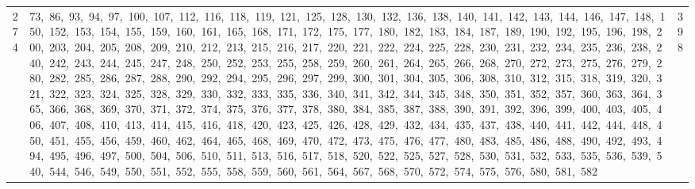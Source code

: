 \begin{longtable}{c|p{}|r}
274 & 73,\ 86,\ 93,\ 94,\ 97,\ 100,\ 107,\ 112,\ 116,\ 118,\ 119,\ 121,\ 125,\ 128,\ 130,\ 132,\ 136,\ 138,\ 140,\ 141,\ 142,\ 143,\ 144,\ 146,\ 147,\ 148,\ 150,\ 152,\ 153,\ 154,\ 155,\ 159,\ 160,\ 161,\ 165,\ 168,\ 171,\ 172,\ 175,\ 177,\ 180,\ 182,\ 183,\ 184,\ 187,\ 189,\ 190,\ 192,\ 195,\ 196,\ 198,\ 200,\ 203,\ 204,\ 205,\ 208,\ 209,\ 210,\ 212,\ 213,\ 215,\ 216,\ 217,\ 220,\ 221,\ 222,\ 224,\ 225,\ 228,\ 230,\ 231,\ 232,\ 234,\ 235,\ 236,\ 238,\ 240,\ 242,\ 243,\ 244,\ 245,\ 247,\ 248,\ 250,\ 252,\ 253,\ 255,\ 258,\ 259,\ 260,\ 261,\ 264,\ 265,\ 266,\ 268,\ 270,\ 272,\ 273,\ 275,\ 276,\ 279,\ 280,\ 282,\ 285,\ 286,\ 287,\ 288,\ 290,\ 292,\ 294,\ 295,\ 296,\ 297,\ 299,\ 300,\ 301,\ 304,\ 305,\ 306,\ 308,\ 310,\ 312,\ 315,\ 318,\ 319,\ 320,\ 321,\ 322,\ 323,\ 324,\ 325,\ 328,\ 329,\ 330,\ 332,\ 333,\ 335,\ 336,\ 340,\ 341,\ 342,\ 344,\ 345,\ 348,\ 350,\ 351,\ 352,\ 357,\ 360,\ 363,\ 364,\ 365,\ 366,\ 368,\ 369,\ 370,\ 371,\ 372,\ 374,\ 375,\ 376,\ 377,\ 378,\ 380,\ 384,\ 385,\ 387,\ 388,\ 390,\ 391,\ 392,\ 396,\ 399,\ 400,\ 403,\ 405,\ 406,\ 407,\ 408,\ 410,\ 413,\ 414,\ 415,\ 416,\ 418,\ 420,\ 423,\ 425,\ 426,\ 428,\ 429,\ 432,\ 434,\ 435,\ 437,\ 438,\ 440,\ 441,\ 442,\ 444,\ 448,\ 450,\ 451,\ 455,\ 456,\ 459,\ 460,\ 462,\ 464,\ 465,\ 468,\ 469,\ 470,\ 472,\ 473,\ 475,\ 476,\ 477,\ 480,\ 483,\ 485,\ 486,\ 488,\ 490,\ 492,\ 493,\ 494,\ 495,\ 496,\ 497,\ 500,\ 504,\ 506,\ 510,\ 511,\ 513,\ 516,\ 517,\ 518,\ 520,\ 522,\ 525,\ 527,\ 528,\ 530,\ 531,\ 532,\ 533,\ 535,\ 536,\ 539,\ 540,\ 544,\ 546,\ 549,\ 550,\ 551,\ 552,\ 555,\ 558,\ 559,\ 560,\ 561,\ 564,\ 567,\ 568,\ 570,\ 572,\ 574,\ 575,\ 576,\ 580,\ 581,\ 582 & 398 \\

\end{longtable}
